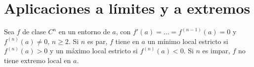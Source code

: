 \addtocounter{definicion}{1}%

\section{Aplicaciones a límites y a extremos}

\addtocounter{definicion}{1}%

\begin{proposicion}\label{prop:criterio-n}
Sea $f$ de clase $C^{n}$ en un entorno de $a$, con $f'(a)=\dots=f^{(n-1)}(a)=0$ y $f^{(n)}(a)\ne0$, $n\ge2$. Si $n$ es par, $f$ tiene en $a$ un mínimo local estricto si $f^{(n)}(a)>0$ y un máximo local estricto si $f^{(n)}(a)<0$. Si $n$ es impar, $f$ no tiene extremo local en $a$.
\end{proposicion}

\addtocounter{definicion}{1}%

\addtocounter{definicion}{1}%

